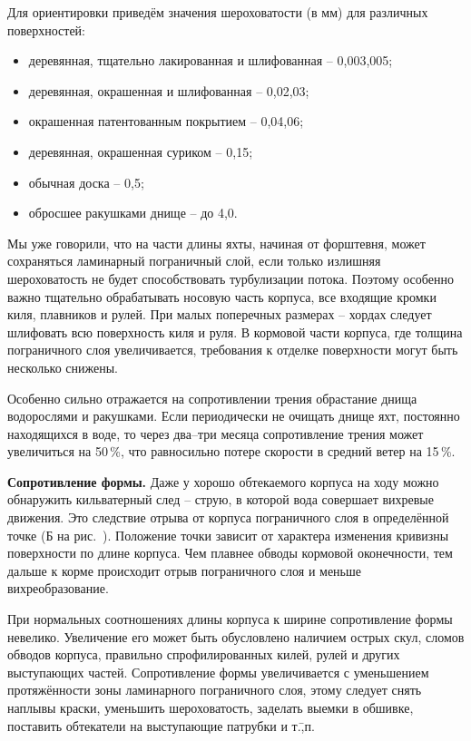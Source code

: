 Для ориентировки приведём значения шероховатости (в мм) для различных поверхностей:
\begin{itemize}
\item деревянная, тщательно лакированная и шлифованная \--- 0,003,005; 
\item деревянная, окрашенная и шлифованная \--- 0,02,03; 
\item окрашенная патентованным покрытием \--- 0,04,06; 
\item деревянная, окрашенная суриком \--- 0,15; 
\item обычная доска \--- 0,5; 
\item обросшее ракушками днище \--- до 4,0.
\end{itemize}

Мы уже говорили, что на части длины яхты, начиная от форштевня, может
сохраняться ламинарный пограничный слой, если только излишняя
шероховатость не будет способствовать турбулизации потока. Поэтому
особенно важно тщательно обрабатывать носовую часть корпуса, все
входящие кромки киля, плавников и рулей. При малых поперечных размерах
\--- хордах следует шлифовать всю поверхность киля и руля. В кормовой
части корпуса, где толщина пограничного слоя увеличивается, требования
к отделке поверхности могут быть несколько снижены.

Особенно сильно отражается на сопротивлении трения обрастание днища
водорослями и ракушками. Если периодически не очищать днище яхт,
постоянно находящихся в воде, то через два--три месяца сопротивление
трения может увеличиться на 50\,\%, что равносильно потере
скорости в средний ветер на 15\,\%.

\textbf{Сопротивление формы.} Даже у хорошо
обтекаемого корпуса на ходу можно обнаружить кильватерный след \---
струю, в которой вода совершает вихревые движения. Это следствие
отрыва от корпуса пограничного слоя в определённой точке (Б на
рис.~). Положение точки зависит от характера изменения
кривизны поверхности по длине корпуса. Чем плавнее обводы кормовой
оконечности, тем дальше к корме происходит отрыв пограничного слоя и
меньше вихреобразование.

При нормальных соотношениях длины корпуса к ширине сопротивление формы
невелико. Увеличение его может быть обусловлено наличием острых скул,
сломов обводов корпуса, правильно спрофилированных килей, рулей и
других выступающих частей. Сопротивление формы увеличивается с
уменьшением протяжённости зоны ламинарного пограничного слоя, этому
следует снять наплывы краски, уменьшить шероховатость, заделать выемки
в обшивке, поставить обтекатели на выступающие патрубки и т.\=,п.

